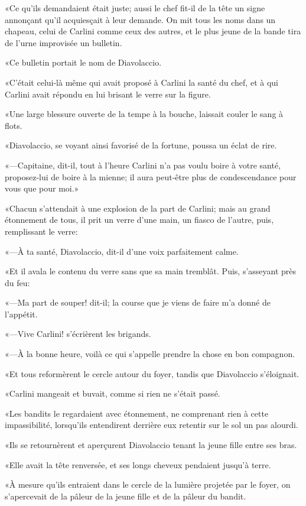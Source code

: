 «Ce qu'ils demandaient était juste; aussi le chef fit-il de la tête un signe annonçant qu'il acquiesçait à leur demande. On mit tous les noms dans un chapeau, celui de Carlini comme ceux des autres, et le plus jeune de la bande tira de l'urne improvisée un bulletin. 

«Ce bulletin portait le nom de Diavolaccio. 

«C'était celui-là même qui avait proposé à Carlini la santé du chef, et à qui Carlini avait répondu en lui brisant le verre sur la figure. 

«Une large blessure ouverte de la tempe à la bouche, laissait couler le sang à flots. 

«Diavolaccio, se voyant ainsi favorisé de la fortune, poussa un éclat de rire. 

«—Capitaine, dit-il, tout à l'heure Carlini n'a pas voulu boire à votre santé, proposez-lui de boire à la mienne; il aura peut-être plus de condescendance pour vous que pour moi.» 

«Chacun s'attendait à une explosion de la part de Carlini; mais au grand étonnement de tous, il prit un verre d'une main, un fiasco de l'autre, puis, remplissant le verre: 

«—À ta santé, Diavolaccio, dit-il d'une voix parfaitement calme. 

«Et il avala le contenu du verre sans que sa main tremblât. Puis, s'asseyant près du feu: 

«—Ma part de souper! dit-il; la course que je viens de faire m'a donné de l'appétit. 

«—Vive Carlini! s'écrièrent les brigands. 

«—À la bonne heure, voilà ce qui s'appelle prendre la chose en bon compagnon.  

«Et tous reformèrent le cercle autour du foyer, tandis que Diavolaccio s'éloignait. 

«Carlini mangeait et buvait, comme si rien ne s'était passé. 

«Les bandits le regardaient avec étonnement, ne comprenant rien à cette impassibilité, lorsqu'ils entendirent derrière eux retentir sur le sol un pas alourdi. 

«Ils se retournèrent et aperçurent Diavolaccio tenant la jeune fille entre ses bras. 

«Elle avait la tête renversée, et ses longs cheveux pendaient jusqu'à terre. 

«À mesure qu'ils entraient dans le cercle de la lumière projetée par le foyer, on s'apercevait de la pâleur de la jeune fille et de la pâleur du bandit. 


